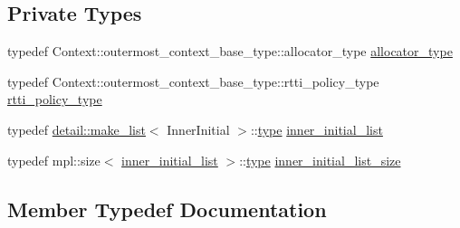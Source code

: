 \subsection*{Private Types}
\begin{DoxyCompactItemize}
\item 
typedef Context\+::outermost\+\_\+context\+\_\+base\+\_\+type\+::allocator\+\_\+type \mbox{\hyperlink{structboost_1_1statechart_1_1detail_1_1simple__state__base__type_a435aafee614e28d33bab92dffc2e879b}{allocator\+\_\+type}}
\item 
typedef Context\+::outermost\+\_\+context\+\_\+base\+\_\+type\+::rtti\+\_\+policy\+\_\+type \mbox{\hyperlink{structboost_1_1statechart_1_1detail_1_1simple__state__base__type_a6a41400b974abd80bbd4c10ed753745b}{rtti\+\_\+policy\+\_\+type}}
\item 
typedef \mbox{\hyperlink{structboost_1_1statechart_1_1detail_1_1make__list}{detail\+::make\+\_\+list}}$<$ Inner\+Initial $>$\+::\mbox{\hyperlink{structboost_1_1statechart_1_1detail_1_1simple__state__base__type_af90a0a8f976dd22839145952facf37b7}{type}} \mbox{\hyperlink{structboost_1_1statechart_1_1detail_1_1simple__state__base__type_aac74557aa49951c88f68f5b66470b679}{inner\+\_\+initial\+\_\+list}}
\item 
typedef mpl\+::size$<$ \mbox{\hyperlink{structboost_1_1statechart_1_1detail_1_1simple__state__base__type_aac74557aa49951c88f68f5b66470b679}{inner\+\_\+initial\+\_\+list}} $>$\+::\mbox{\hyperlink{structboost_1_1statechart_1_1detail_1_1simple__state__base__type_af90a0a8f976dd22839145952facf37b7}{type}} \mbox{\hyperlink{structboost_1_1statechart_1_1detail_1_1simple__state__base__type_a575dd67321ac3022634df1f716a93131}{inner\+\_\+initial\+\_\+list\+\_\+size}}
\end{DoxyCompactItemize}


\subsection{Member Typedef Documentation}
\mbox{\label{structboost_1_1statechart_1_1detail_1_1simple__state__base__type_a435aafee614e28d33bab92dffc2e879b}} 
